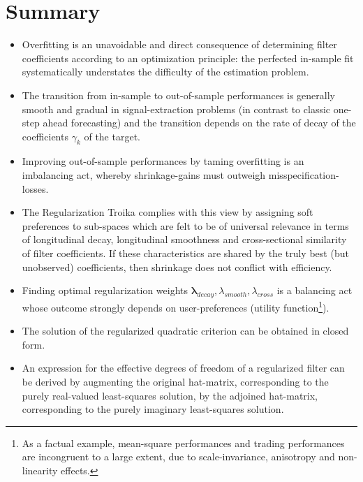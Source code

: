 \documentclass[a4paper]{book}
\begin{document}
\section{Summary}

\begin{itemize}
\item Overfitting is an unavoidable and direct consequence of determining filter coefficients according to an optimization principle: the perfected in-sample fit systematically understates the difficulty of the estimation problem. 
\item The transition from in-sample to out-of-sample performances  is generally smooth and gradual in signal-extraction problems (in contrast to classic one-step ahead forecasting) and the transition depends on the rate of decay of the coefficients $\gamma_k$ of the target.  
\item Improving out-of-sample performances by taming overfitting is an imbalancing act, whereby shrinkage-gains must outweigh misspecification-losses.
\item The Regularization Troika complies with this view by assigning soft preferences to sub-spaces which are felt to be of universal relevance in terms of longitudinal decay, longitudinal smoothness and cross-sectional similarity of filter coefficients. If these characteristics are shared by the truly best (but unobserved) coefficients, then shrinkage does not conflict with efficiency.
\item Finding optimal regularization weights $\boldsymbol{\lambda}_{decay},\lambda_{smooth}, \lambda_{cross}$ is a balancing act whose outcome strongly depends on user-preferences (utility function\footnote{As a factual example, mean-square performances and trading performances are incongruent to a large extent, due to scale-invariance, anisotropy and non-linearity effects.}). 
\item The solution of the regularized quadratic criterion can be obtained in closed form. 
\item An expression for the effective degrees of freedom of a regularized filter can be derived by augmenting the original hat-matrix, corresponding to the purely real-valued least-squares solution, by the adjoined hat-matrix, corresponding to the purely imaginary least-squares solution.
\end{itemize}

\end{document}
